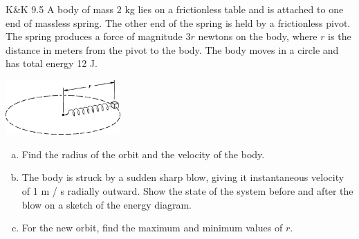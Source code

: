 \documentclass{esg8012pset}
\begin{document}
\begin{problem}{K\&K 9.5}
  A body of mass 2 kg lies on a frictionless table and is attached to one end of massless spring. The other end of the spring is held by a frictionless pivot. The spring produces a force of magnitude $3r$  newtons on the body, where $r$ is the distance in meters from the pivot to the body. The body moves in a circle and has total energy 12 J.
  \begin{center}\includegraphics[width=0.33\textwidth]{ps10_1}\end{center}
  \begin{enumerate}[(a)]
    \item Find the radius of the orbit and the velocity of the body.
    \item The body is struck by a sudden sharp blow, giving it instantaneous velocity of 1 m / s radially outward. Show the state of the system before and after the blow on a sketch of the energy diagram.
    \item For the new orbit, find the maximum and minimum values of $r$.
  \end{enumerate}
\end{problem}
\end{document}
